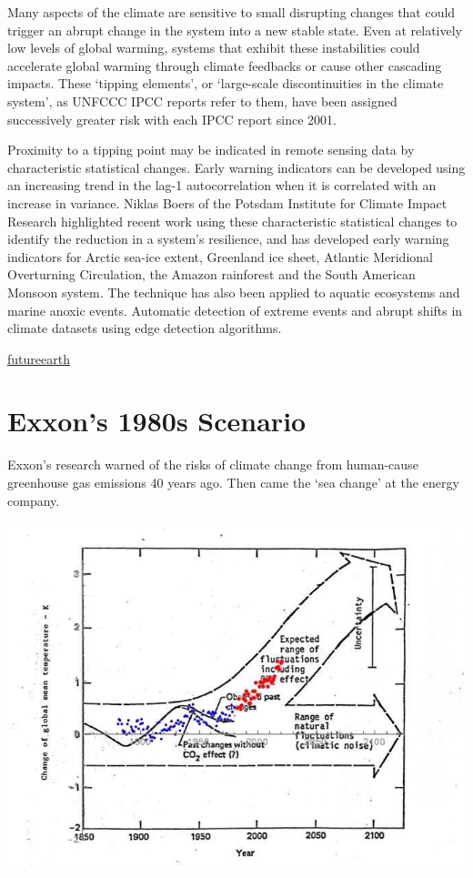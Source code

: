 \documentclass[
]{book}
\begin{document}
Many aspects of the climate are sensitive to small disrupting changes that could trigger an abrupt change in the system into a new stable state. Even at relatively low levels of global warming, systems that exhibit these instabilities could accelerate global warming through climate feedbacks or cause other cascading impacts. These `tipping elements', or `large-scale discontinuities in the climate system', as UNFCCC IPCC reports refer to them, have been assigned successively greater risk with each IPCC report since 2001.

Proximity to a tipping point may be indicated in remote sensing data by characteristic statistical changes.
Early warning indicators can be developed using an increasing trend in the lag-1 autocorrelation when it is correlated with an increase in variance.
Niklas Boers of the Potsdam Institute for Climate Impact Research highlighted recent work using these characteristic statistical changes to identify the reduction in a system's resilience, and has developed early warning indicators for Arctic sea-ice extent, Greenland ice sheet, Atlantic Meridional Overturning Circulation, the Amazon rainforest and the South American Monsoon system. The technique has also been applied to aquatic ecosystems and marine anoxic events.
Automatic detection of extreme events and abrupt shifts in climate datasets using edge detection algorithms.

\href{https://futureearth.org/2021/02/22/remote-sensing-of-tipping-points-in-the-climate-system/}{futureearth}

\hypertarget{exxons-1980s-scenario}{%
\section{Exxon's 1980s Scenario}\label{exxons-1980s-scenario}}

Exxon's research warned of the risks of climate change from human-cause greenhouse gas emissions 40 years ago. Then came the `sea change' at the energy company.

\includegraphics{fig/Exxon_Paths_Chart.jpeg}
\end{document}

